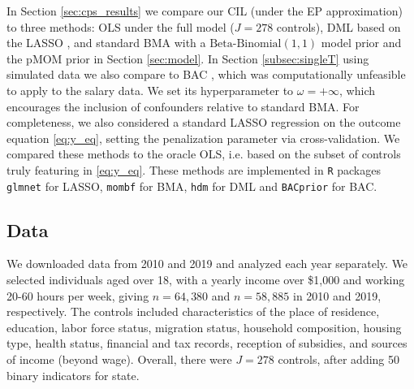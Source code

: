 \documentclass[12pt]{article}
\newcommand{\davidcom}[1]{{\color{red} [DR. #1]} }
\begin{document}
In Section \ref{sec:cps_results} we compare our CIL (under the EP approximation) to three methods: OLS under the full model ($J=278$ controls), DML based on the LASSO \citep{Belloni14b}, and standard BMA with a $\text{Beta-Binomial}(1,1)$ model prior and the pMOM prior in Section \ref{sec:model}.
In Section \ref{subsec:singleT} using simulated data we also compare to BAC \citep{Wang12}, which was computationally unfeasible to apply to the salary data. We set its hyperparameter to $\omega = +\infty$, which encourages the inclusion of confounders relative to %
standard BMA. For completeness, we also considered a standard LASSO regression on the outcome equation \eqref{eq:y_eq}, setting the penalization parameter via cross-validation. 
We compared these methods to the oracle OLS, i.e. based on the subset of controls truly featuring in \eqref{eq:y_eq}. 
These methods are implemented in \texttt{R} packages \texttt{glmnet} \citep{glmnet} for LASSO, \texttt{mombf} for BMA, \texttt{hdm} \citep{hdm} for DML and \texttt{BACprior} \citep{BACprior} for BAC. %


\subsection{Data}
\label{sec:cps_data}

We downloaded data %
from 2010 and 2019 and analyzed each year separately. %
We selected individuals aged over 18, with a yearly income over \$1,000 and working 20-60 hours per week, giving $n=64,380$ and $n=58,885$ in 2010 and 2019, respectively. 
The controls included characteristics of the place of residence, education, labor force status, migration status, household composition, housing type, health status, financial and tax records, reception of subsidies, and sources of income (beyond wage). 
Overall, there were $J=278$ controls, after adding 50 binary indicators for state. 
\end{document}
